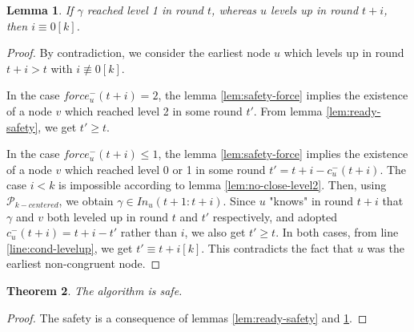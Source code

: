 \documentclass[11pt,letterpaper]{article}
\newtheorem{thm}{Theorem}
\newtheorem{lem}[thm]{Lemma}
\newcommand{\cent}{\gamma}
\begin{document}
\begin{lem} \label{lem:later-level1}
	If $\cent$ reached level 1 in round $t$, whereas $u$ levels up in round $t+i$, then $i \equiv 0 [k]$. 
\end{lem}
\begin{proof}
	By contradiction, we consider the earliest node $u$ which levels up in round $t+i > t$ with $i \not\equiv 0 [k]$.

	In the case $force_u^-(t+i) = 2$, the lemma \ref{lem:safety-force} implies the existence of a node $v$ which reached level 2 in some round $t'$. 
	From lemma \ref{lem:ready-safety}, we get $t' \geq t$.

	In the case $force_u^-(t+i) \leq 1$, the lemma \ref{lem:safety-force} implies the existence of a node $v$ which reached level 0 or 1 in some round $t' = t+i-c_u^-(t+i)$. 
	The case $i < k$ is impossible according to lemma \ref{lem:no-close-level2}.
	Then, using $\mathcal{P}_{k-centered}$, we obtain $\cent \in In_u(t+1:t+i)$.
	Since $u$ "knows" in round $t+i$ that $\cent$ and $v$ both leveled up in round $t$ and $t'$ respectively, and adopted $c_u^-(t+i) = t+i-t'$ rather than $i$,
	we also get $t' \geq t$.
	In both cases, from line \ref{line:cond-levelup}, we get $t' \equiv t+i [k]$.
	This contradicts the fact that $u$ was the earliest non-congruent node.
\end{proof}

\begin{thm} \label{lem:safety} 
	The algorithm is safe.
\end{thm}
\begin{proof}
	The safety is a consequence of lemmas \ref{lem:ready-safety} and \ref{lem:later-level1}.
\end{proof}
\end{document}
